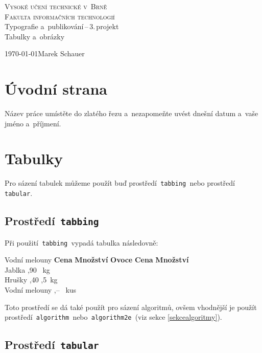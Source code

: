 \documentclass[a4paper, 11pt]{article}
\begin{document}
	

\begin{titlepage}
\begin{center}
{\Huge\textsc{Vysoké učení technické v~Brně}}\\
\medskip
{\huge\textsc{Fakulta informačních technologií}}\\
{\LARGE Typografie a~publikování\,--\,3.\,projekt}\\
\medskip
{\Huge Tabulky a~obrázky}\\
\end{center}
{\Large\today \hfill Marek Schauer}
\end{titlepage}

\section{Úvodní strana}
Název práce umístěte do zlatého řezu a~nezapomeňte uvést dnešní datum a~vaše jméno a~příjmení.

\section{Tabulky}
Pro sázení tabulek můžeme použít buď prostředí\texttt{ tabbing }nebo prostředí\texttt{ tabular}.

\subsection{Prostředí\texttt{ tabbing}}
Při použití\texttt{ tabbing }vypadá tabulka následovně:
\begin{tabbing}
Vodní melouny \quad\= \textbf{Cena} \quad\= \textbf{Množství} \kill
\textbf{Ovoce} \> \textbf{Cena} \> \textbf{Množství}\\
Jablka ,90 \ kg\\
Hrušky ,40 ,5\ kg\\
Vodní melouny ,-- \ kus
\end{tabbing}

\bigskip
\noindent Toto prostředí se dá také použít pro sázení algoritmů, ovšem vhodnější je použít 
prostředí\texttt{ algorithm }nebo\texttt{ algorithm2e }(viz sekce \ref{sekcealgoritmy}).

\subsection{Prostředí\texttt{ tabular}}
\end{document}
